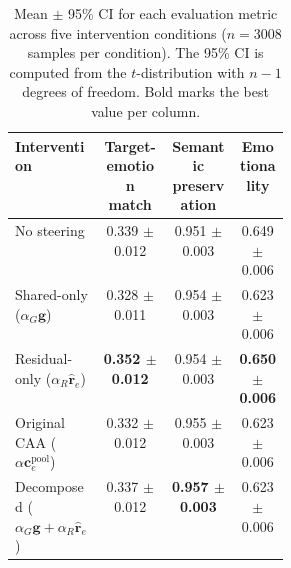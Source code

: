 \begin{table}[H]
\centering
\small
\begin{tabular}{p{0.32\linewidth}ccc}
\toprule
\textbf{Intervention} & \textbf{Target-emotion match} & \textbf{Semantic preservation} & \textbf{Emotionality} \\
\midrule
  No steering & 0.339 $\pm$ 0.012 & 0.951 $\pm$ 0.003 & 0.649 $\pm$ 0.006 \\

  Shared-only ($\alpha_G \mathbf{g}$) & 0.328 $\pm$ 0.011 & 0.954 $\pm$ 0.003 & 0.623 $\pm$ 0.006 \\

  Residual-only ($\alpha_R \hat{\mathbf{r}}_e$) & \textbf{0.352 $\pm$ 0.012} & 0.954 $\pm$ 0.003 & \textbf{0.650 $\pm$ 0.006} \\

  Original CAA ($\alpha \mathbf{c}^{\mathrm{pool}}_e$) & 0.332 $\pm$ 0.012 & 0.955 $\pm$ 0.003 & 0.623 $\pm$ 0.006 \\

  Decomposed ($\alpha_G \mathbf{g} + \alpha_R \hat{\mathbf{r}}_e$) & 0.337 $\pm$ 0.012 & \textbf{0.957 $\pm$ 0.003} & 0.623 $\pm$ 0.006 \\
\bottomrule
\end{tabular}
\caption{Mean $\pm$ 95\% CI for each evaluation metric across five intervention conditions ($n=3008$ samples per condition). The 95\% CI is computed from the $t$-distribution with $n-1$ degrees of freedom. Bold marks the best value per column.}
\label{tab:steering_results_ci}
\end{table}